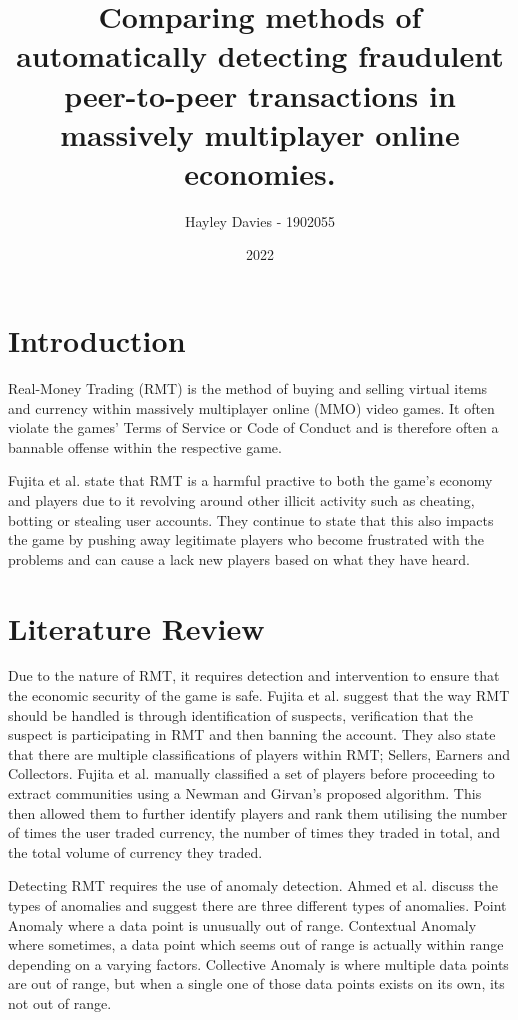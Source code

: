 \documentclass{article}
\title{Comparing methods of automatically detecting fraudulent peer-to-peer transactions in massively multiplayer online economies.}
\author{Hayley Davies - 1902055}
\date{2022}
\begin{document}
\begin{titlepage}
        \maketitle
\end{titlepage}

\section{Introduction}
Real-Money Trading (RMT) is the method of buying and selling virtual items and currency within massively multiplayer online (MMO) video games. It often violate the games' Terms of Service or Code of Conduct and is therefore often a bannable offense within the respective game.\cite{AmazonGamesCOC}\cite{SquareEnixCOC}

Fujita et al. state that RMT is a harmful practive to both the game's economy and players due to it revolving around other illicit activity such as cheating, botting or stealing user accounts. They continue to state that this also impacts the game by pushing away legitimate players who become frustrated with the problems and can cause a lack new players based on what they have heard.\cite{Fujita2011}

\section{Literature Review}
Due to the nature of RMT, it requires detection and intervention to ensure that the economic security of the game is safe. Fujita et al. suggest that the way RMT should be handled is through identification of suspects, verification that the suspect is participating in RMT and then banning the account. They also state that there are multiple classifications of players within RMT; Sellers, Earners and Collectors.\cite{Fujita2011} Fujita et al. manually classified a set of players before proceeding to extract communities using a Newman and Girvan's proposed algorithm. This then allowed them to further identify players and rank them utilising the number of times the user traded currency, the number of times they traded in total, and the total volume of currency they traded.

Detecting RMT requires the use of anomaly detection. Ahmed et al. discuss the types of anomalies and suggest there are three different types of anomalies. Point Anomaly where a data point is unusually out of range. Contextual Anomaly where sometimes, a data point which seems out of range is actually within range depending on a varying factors. Collective Anomaly is where multiple data points are out of range, but when a single one of those data points exists on its own, its not out of range.\cite{Ahmed2016}
\end{document}
